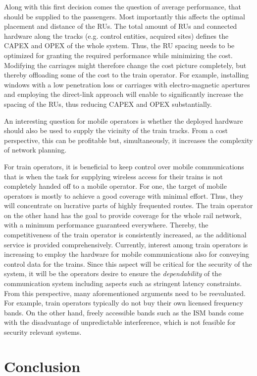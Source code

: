 \documentclass[a4paper,conference,twocolumn,10pt]{IEEEtran}
\begin{document}
Along with this first decision comes the question of average performance, that should be supplied to the passengers. Most importantly this affects the optimal placement and distance of the \acp{RU}. The total amount of \acp{RU} and connected hardware along the tracks (e.g. control entities, acquired sites) defines the \ac{CAPEX} and \ac{OPEX} of the whole system. Thus, the \ac{RU} spacing needs to be optimized for granting the required performance while minimizing the cost. Modifying the carriages might therefore change the cost picture completely, but thereby offloading some of the cost to the train operator. For example, installing windows with a low penetration loss or carriages with electro-magnetic apertures and employing the direct-link approach will enable to significantly increase the spacing of the \acp{RU}, thus reducing \ac{CAPEX} and \ac{OPEX} substantially.

An interesting question for mobile operators is whether the deployed hardware should also be used to supply the vicinity of the train tracks. From a cost perspective, this can be profitable but, simultaneously, it increases the complexity of network planning.

For train operators, it is beneficial to keep control over mobile communications that is when the task for supplying wireless access for their trains is not completely handed off to a mobile operator. For one, the target of mobile operators is mostly to achieve a good coverage with minimal effort. Thus, they will concentrate on lucrative parts of highly frequented routes. The train operator on the other hand has the goal to provide coverage for the whole rail network, with a minimum performance guaranteed everywhere. Thereby, the competitiveness of the train operator is consistently increased, as the additional service is provided comprehensively. Currently, interest among train operators is increasing to employ the hardware for mobile communications also for conveying control data for the trains. Since this aspect will be critical for the security of the system, it will be the operators desire to ensure the \emph{dependability} of the communication system including aspects such as stringent latency constraints. From this perspective, many aforementioned arguments need to be reevaluated. For example, train operators typically do not buy their own licensed frequency bands. On the other hand, freely accessible bands such as the \ac{ISM} bands come with the disadvantage of unpredictable interference, which is not feasible for security relevant systems.
\section{Conclusion}
\label{Sec:Conclusion}
\end{document}
